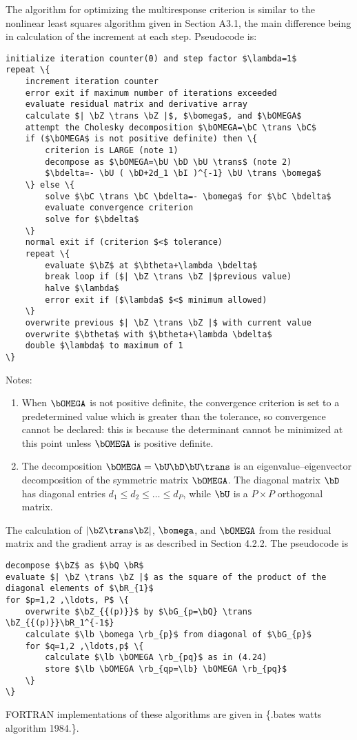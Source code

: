{The algorithm for optimizing the multiresponse criterion is similar to
the nonlinear least squares algorithm given in Section A3.1, the main
difference being in calculation of the increment at each step.
Pseudocode is:
\begin{verbatim}
initialize iteration counter(0) and step factor $\lambda=1$
repeat \{
    increment iteration counter
    error exit if maximum number of iterations exceeded
    evaluate residual matrix and derivative array
    calculate $| \bZ \trans \bZ |$, $\bomega$, and $\bOMEGA$
    attempt the Cholesky decomposition $\bOMEGA=\bC \trans \bC$
    if ($\bOMEGA$ is not positive definite) then \{
        criterion is LARGE (note 1)
        decompose as $\bOMEGA=\bU \bD \bU \trans$ (note 2)
        $\bdelta=- \bU ( \bD+2d_1 \bI )^{-1} \bU \trans \bomega$
    \} else \{
        solve $\bC \trans \bC \bdelta=- \bomega$ for $\bC \bdelta$
        evaluate convergence criterion
        solve for $\bdelta$
    \}
    normal exit if (criterion $<$ tolerance)
    repeat \{
        evaluate $\bZ$ at $\btheta+\lambda \bdelta$
        break loop if ($| \bZ \trans \bZ |$previous value)
        halve $\lambda$
        error exit if ($\lambda$ $<$ minimum allowed)
    \}
    overwrite previous $| \bZ \trans \bZ |$ with current value
    overwrite $\btheta$ with $\btheta+\lambda \bdelta$
    double $\lambda$ to maximum of 1
\}
\end{verbatim}

Notes:
\begin{enumerate}
\item When $\bOMEGA$ is not positive definite, the convergence
  criterion is set to a predetermined value which is greater than the
  tolerance, so convergence cannot be declared: this is because the
  determinant cannot be minimized at this point unless $\bOMEGA$ is
  positive definite.
\item The decomposition $\bOMEGA=\bU \bD \bU \trans$ is an
  eigenvalue--eigenvector decomposition of the symmetric matrix
  $\bOMEGA$.  The diagonal matrix $\bD$ has diagonal entries $d_1 \le
  d_2 \le\ldots\le d _{P}$, while $\bU$ is a $P\times P$ orthogonal matrix.
\end{enumerate}

The calculation of $| \bZ \trans \bZ |$, $\bomega$, and $\bOMEGA$ from the
residual matrix and the gradient array is as described in Section
4.2.2.  The pseudocode is
\begin{verbatim}
decompose $\bZ$ as $\bQ \bR$
evaluate $| \bZ \trans \bZ |$ as the square of the product of the diagonal elements of $\bR_{1}$
for $p=1,2 ,\ldots, P$ \{
    overwrite $\bZ_{{(p)}}$ by $\bG_{p=\bQ} \trans \bZ_{{(p)}}\bR_1^{-1$}
    calculate $\lb \bomega \rb_{p}$ from diagonal of $\bG_{p}$
    for $q=1,2 ,\ldots,p$ \{
        calculate $\lb \bOMEGA \rb_{pq}$ as in (4.24)
        store $\lb \bOMEGA \rb_{qp=\lb} \bOMEGA \rb_{pq}$
    \}
\}
\end{verbatim}
FORTRAN implementations of these algorithms are given in \{.bates watts
algorithm 1984.\}.
\par\vspace{0.0\baselineskip}
}
